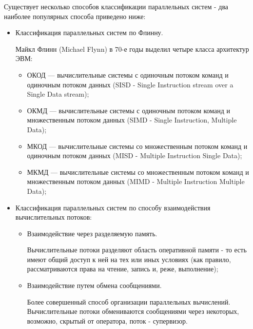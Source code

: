 Существует несколько способов классификации параллельных систем - два наиболее популярных способа приведено ниже:

\begin{itemize}

	\item Классификация параллельных систем по Флинну.

	Майкл Флинн (Michael Flynn) в 70-е годы выделил четыре класса архитектур ЭВМ:

	\begin{itemize}
	
		\item ОКОД — вычислительные системы с одиночным потоком команд и одиночным потоком данных (SISD - Single Instruction stream over a Single Data stream);
		\item ОКМД — вычислительные системы с одиночным потоком команд и множественным потоком данных (SIMD - Single Instruction, Multiple Data);
		\item МКОД — вычислительные системы со множественным потоком команд и одиночным потоком данных (MISD - Multiple Instruction Single Data);
		\item МКМД — вычислительные системы со множественным потоком команд и множественным потоком данных (MIMD - Multiple Instruction Multiple Data);

	\end{itemize}

	\item Классификация параллельных систем по способу взаимодействия вычислительных потоков:

	\begin{itemize}

		\item Взаимодействие через разделяемую память.

			Вычислительные потоки разделяют область оперативной памяти - то есть имеют общий доступ к ней на тех или иных условиях (как правило, рассматриваются права на чтение, запись и, реже, выполнение);

		\item Взаимодействие путем обмена сообщениями.

			Более совершенный способ организации параллельных вычислений. Вычислительные потоки обмениваются сообщениями через некоторых, возможно, скрытый от оператора, поток - супервизор.

	\end{itemize}

\end{itemize}

